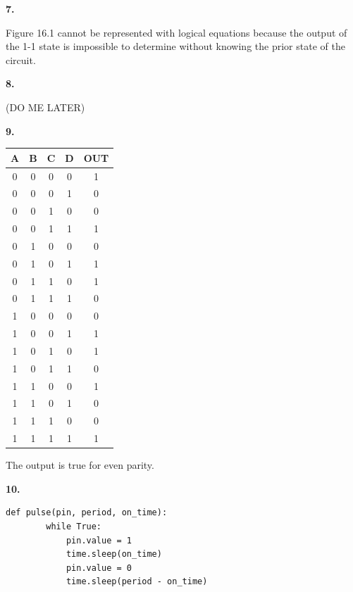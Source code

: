 \documentclass{article}
\begin{document}
\newpage\noindent\textbf{7.}

	Figure 16.1 cannot be represented with logical equations because the output of the 1-1 state is impossible to determine without knowing the prior state of the circuit.

\newpage\noindent\textbf{8.}

	(DO ME LATER)

\newpage\noindent\textbf{9.}

    \begin{tabular}{| c | c | c | c | c |}
        \hline
        A & B & C & D & OUT \\
        \hline
        0 & 0 & 0 & 0 & 1 \\
        0 & 0 & 0 & 1 & 0 \\
        0 & 0 & 1 & 0 & 0 \\
        0 & 0 & 1 & 1 & 1 \\
        0 & 1 & 0 & 0 & 0 \\
        0 & 1 & 0 & 1 & 1 \\
        0 & 1 & 1 & 0 & 1 \\
        0 & 1 & 1 & 1 & 0 \\
        1 & 0 & 0 & 0 & 0 \\
        1 & 0 & 0 & 1 & 1 \\
        1 & 0 & 1 & 0 & 1 \\
        1 & 0 & 1 & 1 & 0 \\
        1 & 1 & 0 & 0 & 1 \\
        1 & 1 & 0 & 1 & 0 \\
        1 & 1 & 1 & 0 & 0 \\
        1 & 1 & 1 & 1 & 1 \\
        \hline
    \end{tabular}

    \medskip The output is true for even parity.

\newpage\noindent\textbf{10.}

	\begin{verbatim}def pulse(pin, period, on_time):
	    while True:
	        pin.value = 1
	        time.sleep(on_time)
	        pin.value = 0
	        time.sleep(period - on_time)
	\end{verbatim}
\end{document}
